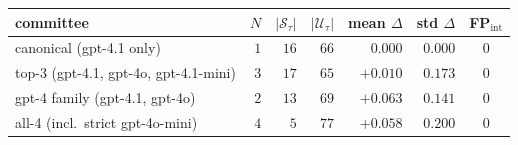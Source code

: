 \small
\setlength{\tabcolsep}{5pt}
\begin{tabular}{lrrrrrc}
\toprule
committee                              & $N$ & $|\mathcal{S}_\tau|$ & $|\mathcal{U}_\tau|$ & mean $\Delta$ & std $\Delta$ & FP$_{\mathrm{int}}$ \\
\midrule
canonical (gpt-4.1 only)               & $1$ & $16$ & $66$ & $\phantom{+}0.000$ & $0.000$ & $0$ \\
top-3 (gpt-4.1, gpt-4o, gpt-4.1-mini)  & $3$ & $17$ & $65$ &         $+0.010$  & $0.173$ & $0$ \\
gpt-4 family (gpt-4.1, gpt-4o)         & $2$ & $13$ & $69$ &         $+0.063$  & $0.141$ & $0$ \\
all-4 (incl.\ strict gpt-4o-mini)      & $4$ & $ 5$ & $77$ &         $+0.058$  & $0.200$ & $0$ \\
\bottomrule
\end{tabular}
